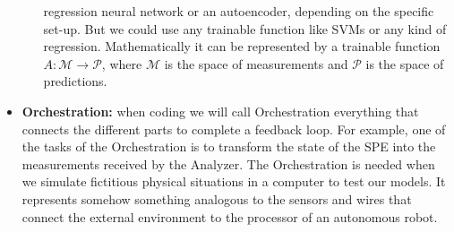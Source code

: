 \documentclass[11pt,a4paper,twoside]{report}
\newcommand{\+}{\textnormal{+} }
\theoremstyle{definition}
\numberwithin{equation}{chapter}
\begin{document}
\begin{itemize}
\begin{itemize}
        regression neural network or an autoencoder, depending on the specific
        set-up. But we could use any trainable function like SVMs or any kind of
        regression. Mathematically it can be represented by a trainable function
        $ A :\mathcal{M} \rightarrow \mathcal{P}$, where $\mathcal{M}$ is the
        space of measurements and $\mathcal{P}$ is the space of predictions.
  \end{itemize}
    \item \textbf{Orchestration:} when coding we will call Orchestration
    everything that connects the different parts to complete a feedback loop.
    For example, one of the tasks of the Orchestration is to transform the state
    of the SPE into the measurements received by the Analyzer. The Orchestration
    is needed when we simulate fictitious physical situations in a computer to
    test our models. It represents somehow something analogous to the sensors
    and wires that connect the external environment to the processor of an
    autonomous robot.
\end{itemize}
\end{document}
